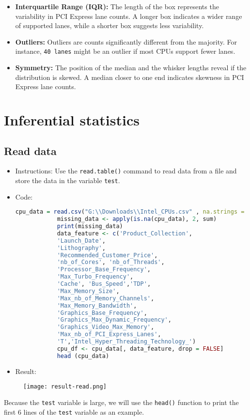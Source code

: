 \documentclass{article}
\begin{document}
\begin{itemize}
\begin{itemize}
\begin{itemize}
				\item \textbf{Interquartile Range (IQR):} The length of the box represents the variability in PCI Express lane counts. A longer box indicates a wider range of supported lanes, while a shorter box suggests less variability.
				\item \textbf{Outliers:} Outliers are counts significantly different from the majority. For instance, \texttt{40 lanes} might be an outlier if most CPUs support fewer lanes.
				\item \textbf{Symmetry:} The position of the median and the whisker lengths reveal if the distribution is skewed. A median closer to one end indicates skewness in PCI Express lane counts.
			\end{itemize}
		\end{itemize}
	\end{itemize}
	\section{Inferential statistics}
	\subsection{Read data}
	\begin{itemize}
		\item Instructions: Use the \texttt{read.table()} command to read data from a file and store the data in the variable \texttt{test}.
		\item
		Code:
		\begin{lstlisting}[language=R]
			cpu_data = read.csv("G:\\Downloads\\Intel_CPUs.csv" , na.strings = c("", "N/A")) 
			missing_data <- apply(is.na(cpu_data), 2, sum)
			print(missing_data)
			data_feature <- c('Product_Collection',
			'Launch_Date',
			'Lithography',
			'Recommended_Customer_Price', 
			'nb_of_Cores', 'nb_of_Threads', 
			'Processor_Base_Frequency',
			'Max_Turbo_Frequency',
			'Cache', 'Bus_Speed','TDP',
			'Max_Memory_Size',
			'Max_nb_of_Memory_Channels', 
			'Max_Memory_Bandwidth',
			'Graphics_Base_Frequency', 
			'Graphics_Max_Dynamic_Frequency',
			'Graphics_Video_Max_Memory',
			'Max_nb_of_PCI_Express_Lanes',
			'T','Intel_Hyper_Threading_Technology_')
			cpu_df <- cpu_data[, data_feature, drop = FALSE]
			head (cpu_data)
		\end{lstlisting}
		\item Result:
	\end{itemize}
	\begin{figure}[h]
		\centering
		\texttt{[image: result-read.png]}  %
		\label{fig:enter-label}
	\end{figure}
	Because the \texttt{test} variable is large, we will use the \texttt{head()} function to print the first 6 lines of the \texttt{test} variable as an example.
\end{document}
